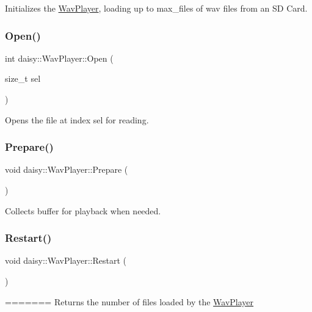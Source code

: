 Initializes the \hyperlink{classdaisy_1_1_wav_player}{Wav\+Player}, loading up to max\+\_\+files of wav files from an SD Card. \mbox{\label{classdaisy_1_1_wav_player_ab125d0c6fb01b45443b57df96255efb9}} 
\subsubsection{\texorpdfstring{Open()}{Open()}}
{\footnotesize\ttfamily int daisy\+::\+Wav\+Player\+::\+Open (\begin{DoxyParamCaption}\item[{size\+\_\+t}]{sel }\end{DoxyParamCaption})}

Opens the file at index sel for reading. \mbox{\label{classdaisy_1_1_wav_player_a1126bb632eb141d2979c25cedde354cd}} 
\subsubsection{\texorpdfstring{Prepare()}{Prepare()}}
{\footnotesize\ttfamily void daisy\+::\+Wav\+Player\+::\+Prepare (\begin{DoxyParamCaption}{ }\end{DoxyParamCaption})}

Collects buffer for playback when needed. \mbox{\label{classdaisy_1_1_wav_player_ac3b2f9f9cdf18ea861be227dcffd5da9}} 
\subsubsection{\texorpdfstring{Restart()}{Restart()}}
{\footnotesize\ttfamily void daisy\+::\+Wav\+Player\+::\+Restart (\begin{DoxyParamCaption}{ }\end{DoxyParamCaption})}
=======
Returns the number of files loaded by the \hyperlink{classdaisy_1_1_wav_player}{Wav\+Player} \mbox{\label{classdaisy_1_1_wav_player_aeb6f0125716b4e8eb7268c8960cc1026}} 
